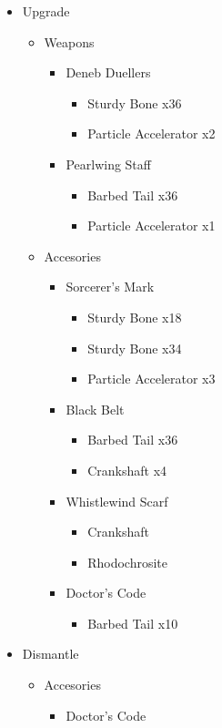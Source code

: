 \begin{upgrade}
	\begin{itemize}
		\item Upgrade
			\begin{itemize}
				\item Weapons
					\begin{itemize}
						\item Deneb Duellers
							\begin{itemize}
								\item Sturdy Bone x36
								\item Particle Accelerator x2
							\end{itemize}
						\item Pearlwing Staff
							\begin{itemize}
								\item Barbed Tail x36
								\item Particle Accelerator x1
							\end{itemize}
					\end{itemize}
				\item Accesories
					\begin{itemize}
						\item Sorcerer's Mark
							\begin{itemize}
								\item Sturdy Bone x18
								\item Sturdy Bone x34
								\item Particle Accelerator x3
							\end{itemize}
						\item Black Belt
							\begin{itemize}
								\item Barbed Tail x36
								\item Crankshaft x4
							\end{itemize}
						\item Whistlewind Scarf
							\begin{itemize}
								\item Crankshaft
								\item Rhodochrosite
							\end{itemize}
						\item Doctor's Code
							\begin{itemize}
								\item Barbed Tail x10
							\end{itemize}
					\end{itemize}
			\end{itemize}
		\item Dismantle
			\begin{itemize}
				\item Accesories
					\begin{itemize}
						\item Doctor's Code
					\end{itemize}
			\end{itemize}
	\end{itemize}
\end{upgrade}

